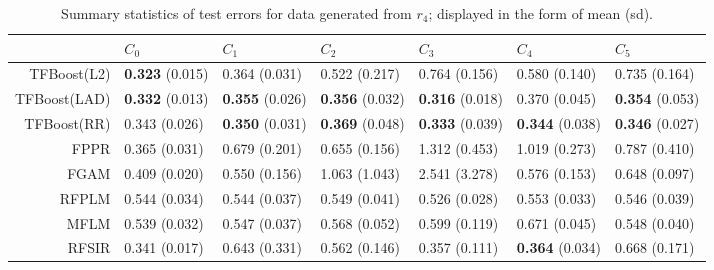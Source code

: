 \begin{table}[H]
\centering
\footnotesize
\begin{tabular}{rllllll}
  \hline
 & $C_0$ & $C_1$ & $C_2$ & $C_3$ & $C_4$ & $C_5$ \\ 
  \hline
TFBoost(L2) & \textbf{0.323} (0.015) & 0.364 (0.031) & 0.522 (0.217) & 0.764 (0.156) & 0.580 (0.140) & 0.735 (0.164) \\ 
  TFBoost(LAD) & \textbf{0.332} (0.013) & \textbf{0.355} (0.026) & \textbf{0.356} (0.032) & \textbf{0.316} (0.018) & 0.370 (0.045) & \textbf{0.354} (0.053) \\ 
  TFBoost(RR) & 0.343 (0.026) & \textbf{0.350} (0.031) & \textbf{0.369} (0.048) & \textbf{0.333} (0.039) & \textbf{0.344} (0.038) & \textbf{0.346} (0.027) \\ 
  FPPR & 0.365 (0.031) & 0.679 (0.201) & 0.655 (0.156) & 1.312 (0.453) & 1.019 (0.273) & 0.787 (0.410) \\ 
  FGAM & 0.409 (0.020) & 0.550 (0.156) & 1.063 (1.043) & 2.541 (3.278) & 0.576 (0.153) & 0.648 (0.097) \\ 
  RFPLM & 0.544 (0.034) & 0.544 (0.037) & 0.549 (0.041) & 0.526 (0.028) & 0.553 (0.033) & 0.546 (0.039) \\ 
  MFLM & 0.539 (0.032) & 0.547 (0.037) & 0.568 (0.052) & 0.599 (0.119) & 0.671 (0.045) & 0.548 (0.040) \\ 
  RFSIR & 0.341 (0.017) & 0.643 (0.331) & 0.562 (0.146) & 0.357 (0.111) & \textbf{0.364} (0.034) & 0.668 (0.171) \\ 
   \hline
\end{tabular}
\caption{Summary statistics of test errors for data generated from $r_4$; displayed in the form of mean (sd).} 
\end{table}
